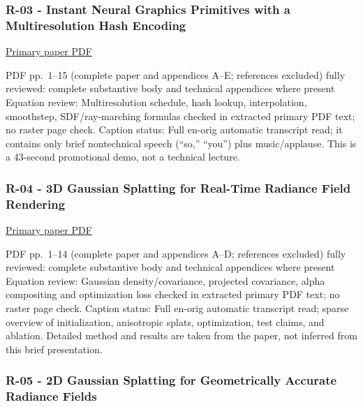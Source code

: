 \subsubsection{R-03 - Instant Neural Graphics Primitives with a Multiresolution Hash Encoding}\label{04-visual-computing-ii-ch036-r-03---instant-neural-graphics-primitives-with-a-multiresolution-hash-encoding}

\href{https://nvlabs.github.io/instant-ngp/assets/mueller2022instant.pdf}{Primary paper PDF}

PDF pp.~1--15 (complete paper and appendices A--E; references excluded) fully reviewed: complete substantive body and technical appendices where present Equation review: Multiresolution schedule, hash lookup, interpolation, smoothstep, SDF/ray-marching formulas checked in extracted primary PDF text; no raster page check. Caption status: Full en-orig automatic transcript read; it contains only brief nontechnical speech (``so,'' ``you'') plus music/applause. This is a 43-second promotional demo, not a technical lecture.

\subsubsection{R-04 - 3D Gaussian Splatting for Real-Time Radiance Field Rendering}\label{04-visual-computing-ii-ch036-r-04---3d-gaussian-splatting-for-real-time-radiance-field-rendering}

\href{https://repo-sam.inria.fr/fungraph/3d-gaussian-splatting/3d_gaussian_splatting_low.pdf}{Primary paper PDF}

PDF pp.~1--14 (complete paper and appendices A--D; references excluded) fully reviewed: complete substantive body and technical appendices where present Equation review: Gaussian density/covariance, projected covariance, alpha compositing and optimization loss checked in extracted primary PDF text; no raster page check. Caption status: Full en-orig automatic transcript read; sparse overview of initialization, anisotropic splats, optimization, test claims, and ablation. Detailed method and results are taken from the paper, not inferred from this brief presentation.

\subsubsection{R-05 - 2D Gaussian Splatting for Geometrically Accurate Radiance Fields}\label{04-visual-computing-ii-ch036-r-05---2d-gaussian-splatting-for-geometrically-accurate-radiance-fields}

